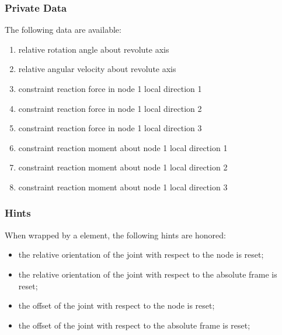 \subsubsection{Private Data}
The following data are available:
\begin{enumerate}
\item {} relative rotation angle about revolute axis
\item {} relative angular velocity about revolute axis
\item {} constraint reaction force in node 1 local direction 1
\item {} constraint reaction force in node 1 local direction 2
\item {} constraint reaction force in node 1 local direction 3
\item {} constraint reaction moment about node 1 local direction 1
\item {} constraint reaction moment about node 1 local direction 2
\item {} constraint reaction moment about node 1 local direction 3
\end{enumerate}

\subsubsection{Hints}
When wrapped by a  element, the following hints are honored:
\begin{itemize}
\item {} the relative orientation of the joint
with respect to the node is reset;
\item {} the relative orientation of the joint
with respect to the absolute frame is reset;
\item {} the offset of the joint
with respect to the node is reset;
\item {} the offset of the joint
with respect to the absolute frame is reset;
\end{itemize}






